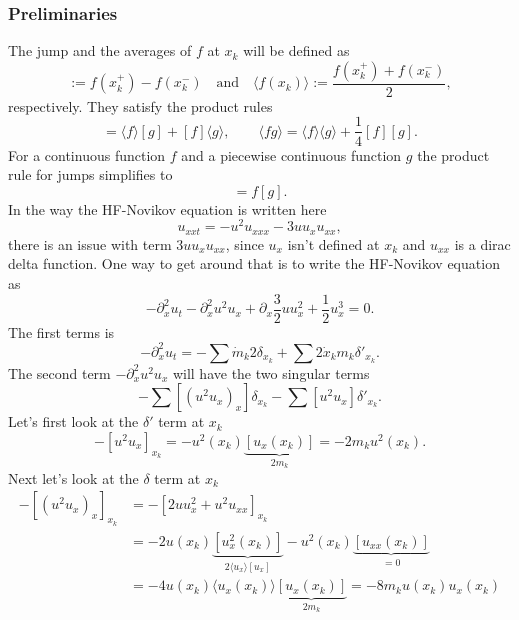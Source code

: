 \documentclass[english,master]{liumaiex}
\theoremstyle{plain}
\theoremstyle{definition}
\begin{document}
\subsubsection*{Preliminaries}

The jump and the averages of $f$ at $x_k$ will be defined as
\begin{equation}
	[f(x_k)] := f(x_k^+) - f(x_k^-) \quad \text{and} \quad \langle f(x_k)\rangle := \frac{f(x_k^+) + f(x_k^-)}{2},
\end{equation}
respectively. They satisfy the product rules
\begin{equation}
	[fg] = \langle f\rangle[g] + [f]\langle g\rangle, \quad \quad \langle fg\rangle = \langle f\rangle\langle g\rangle + \frac{1}{4}[f][g].
\end{equation}
%
For a continuous function $f$ and a piecewise continuous function $g$ the product rule for jumps simplifies to
\begin{equation}
	[fg] = f[g].
\end{equation}
In the way the HF-Novikov equation is written here
\begin{equation}
	u_{xxt} = -u^2u_{xxx} - 3uu_xu_{xx},
\end{equation}
there is an issue with term $3uu_xu_{xx}$, since $u_x$ isn't defined at $x_k$ and $u_{xx}$ is a dirac delta function. One way to get around that is to write the HF-Novikov equation as
\begin{equation}
	-\partial_x^2 u_t - \partial_x^2 u^2 u_x + \partial_x \frac{3}{2} u u_x^2 + \frac{1}{2}u_x^3 = 0.
\end{equation}
%
The first terms is 
\begin{equation}
	-\partial_x^2 u_t = - \sum \dot{m}_k 2 \delta_{x_k} + \sum 2 \dot{x}_k m_k \delta'_{x_k}.
\end{equation}
%
The second term $-\partial_x^2 u^2 u_x$ will have the two singular terms
\begin{equation}
	- \sum [(u^2 u_x)_x] \delta_{x_k} - \sum [u^2 u_x] \delta'_{x_k}.
\end{equation}
%
Let's first look at the $\delta'$ term at $x_k$
\begin{equation}
	- [u^2 u_x]_{x_k} = - u^2(x_k) \underbrace{[u_x(x_k)]}_{2m_k} = -2 m_k u^2(x_k).
\end{equation}
Next let's look at the $\delta$ term at $x_k$
\begin{equation}
\begin{aligned}
	- [(u^2 u_x)_x]_{x_k} &= -[2u u_x^2 + u^2 u_{xx}]_{x_k} \\
		&= - 2u(x_k) \underbrace{[u_x^2(x_k)]}_{2\langle u_x \rangle [u_x]}
		- u^2(x_k) \underbrace{[u_{xx}(x_k)]}_{=0} \\
		&= -4u(x_k) \langle u_x(x_k) \rangle \underbrace{[u_x(x_k)]}_{2m_k} = -8m_k u(x_k) u_x(x_k)
\end{aligned}
\end{equation}
\end{document}
